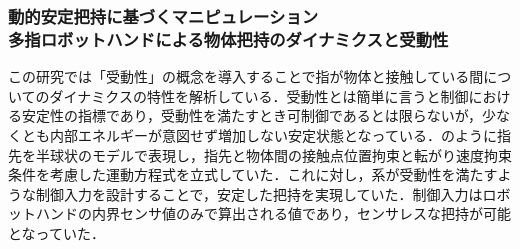 \documentclass[a4paper,twoside,12pt,papersize, dvipdfmx]{iirthesis}
\begin{document}
\subsubsection{動的安定把持に基づくマニピュレーション \cite{tahara2013}\\多指ロボットハンドによる物体把持のダイナミクスと受動性 \cite{tahara2020}}
この研究では「受動性」の概念を導入することで指が物体と接触している間についてのダイナミクスの特性を解析している．受動性とは簡単に言うと制御における安定性の指標であり，受動性を満たすとき可制御であるとは限らないが，少なくとも内部エネルギーが意図せず増加しない安定状態となっている．のように指先を半球状のモデルで表現し，指先と物体間の接触点位置拘束と転がり速度拘束条件を考慮した運動方程式を立式していた．これに対し，系が受動性を満たすような制御入力を設計することで，安定した把持を実現していた．制御入力はロボットハンドの内界センサ値のみで算出される値であり，センサレスな把持が可能となっていた．
\end{document}

